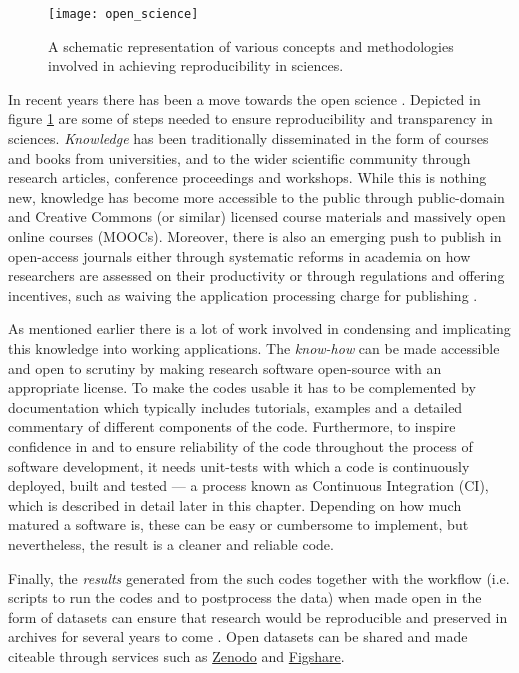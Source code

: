 \begin{figure}[h]
  \centering
  \texttt{[image: open\_science]}
  \caption{A schematic representation of various concepts and methodologies
  involved in achieving reproducibility in sciences.}\label{fig:opensci}
\end{figure}

In recent years there has been a move towards the open science
\citep{royal_society_great_britain_science_2012}. Depicted in figure
\ref{fig:opensci} are some of steps needed to ensure reproducibility and
transparency in sciences. \emph{Knowledge} has been traditionally disseminated
in the form of courses and books from universities, and to the wider scientific
community through research articles, conference proceedings and workshops.
While this is nothing new, knowledge has become more accessible to the public
through public-domain and Creative Commons (or similar) licensed course
materials and massively open online courses (MOOCs). Moreover, there is also an
emerging push to publish in open-access journals either through systematic
reforms in academia on how researchers are assessed on their productivity or
through regulations and offering incentives, such as waiving the application
processing charge for publishing \citep{nosek_promoting_2015}.

As mentioned earlier there is a lot of work involved in condensing and
implicating this knowledge into working applications. The \emph{know-how} can
be made accessible and open to scrutiny by making research software open-source
with an appropriate license. To make the codes usable it has to be complemented
by documentation which typically includes tutorials, examples and a detailed
commentary of different components of the code. Furthermore, to inspire
confidence in and to ensure reliability of the code throughout the process of
software development, it needs unit-tests with which a code is continuously
deployed, built and tested --- a process known as Continuous Integration (CI),
which is described in detail later in this chapter. Depending on how much
matured a software is, these can be easy or cumbersome to implement, but
nevertheless, the result is a cleaner and reliable code.

Finally, the \emph{results} generated from the such codes together with the
workflow (i.e. scripts to run the codes and to postprocess the data) when made
open in the form of datasets can ensure that research would be reproducible and
preserved in archives for several years to come \citep{gewin_data_2016}. Open
datasets can be shared and made citeable through services such as
\href{https://zenodo.org}{Zenodo} and \href{https://figshare.com}{Figshare}.

